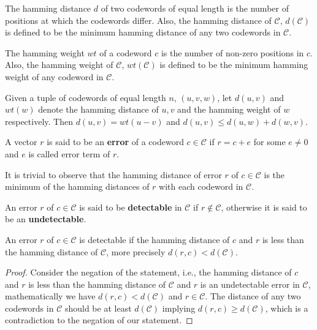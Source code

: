 \begin{definition}
  The hamming distance $d$ of two codewords of equal length is the number of positions at which the 
  codewords differ. Also, the hamming distance of $\mathcal{C}$, $d(\mathcal{C})$ is defined to be the 
  minimum hamming distance of any two codewords in $\mathcal{C}$.
\end{definition}

\begin{definition}
  The hamming weight $wt$ of a codeword $c$ is the number of non-zero positions in $c$. Also, the hamming weight of
  $\mathcal{C}$, $wt(\mathcal{C})$ is defined to be the minimum hamming weight of any codeword in $\mathcal{C}$.
\end{definition}

\begin{lemma}\cite{gallian2024contemporary}\label{lem:distance}
  Given a tuple of codewords of equal length $n$, $(u, v, w)$, let $d(u,v)$ and $wt(w)$ denote the hamming 
  distance of $u, v$ and the hamming weight of $w$ respectively. Then $d(u,v) = wt(u-v)$ and 
  $d(u,v)\leq d(u,w)+d(w,v)$.
\end{lemma}

\begin{definition}[error]
  A vector $r$ is said to be an \textbf{error} of a codeword $c\in\mathcal{C}$ if 
  $r=c+e$ for some $e\neq 0$ and $e$ is called error term of $r$.
\end{definition}

It is trivial to observe that the hamming distance of error $r$ of $c\in\mathcal{C}$ is the minimum of the 
hamming distances of $r$ with each codeword in $\mathcal{C}$.

\begin{definition}
  An error $r$ of $c\in\mathcal{C}$ is said to be \textbf{detectable} in $\mathcal{C}$ if 
  $r\notin\mathcal{C}$, otherwise it is said to be an \textbf{undetectable}.
\end{definition}

\begin{theorem}\cite{gallian2024contemporary}\label{th:detectable-error}
  An error $r$ of $c\in\mathcal{C}$ is detectable if the hamming distance of $c$ 
  and $r$ is less than the hamming distance of $\mathcal{C}$, more precisely 
  $d(r,c)<d(\mathcal{C})$.
\end{theorem}
\begin{proof}
  Consider the negation of the statement, i.e., the hamming distance of $c$ and $r$ is less than 
  the hamming distance of $\mathcal{C}$ and $r$ is an undetectable error in $\mathcal{C}$, mathematically 
  we have $d(r,c)<d(\mathcal{C})$ and $r\in\mathcal{C}$. The distance of any two codewords in 
  $\mathcal{C}$ should be at least $d(\mathcal{C})$ implying $d(r,c)\geq d(\mathcal{C})$, which is a 
  contradiction to the negation of our statement.
\end{proof}

